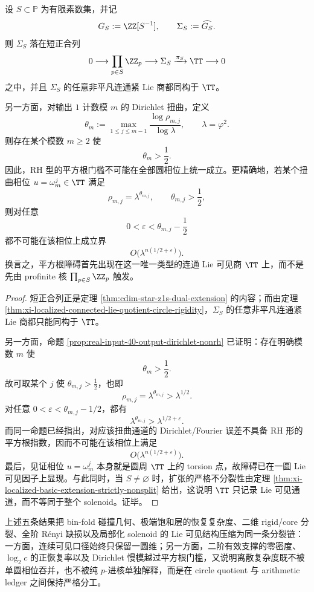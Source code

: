 \begin{theorem}\label{thm:conclusion-circle-lie-factor-square-root-threshold-obstruction}
设 \(S\subset\mathbb P\) 为有限素数集，并记
\[
G_S:=\ZZ[S^{-1}],
\qquad
\Sigma_S:=\widehat{G_S}.
\]
则 \(\Sigma_S\) 落在短正合列
\[
0\longrightarrow \prod_{p\in S}\ZZ_p\longrightarrow \Sigma_S\xrightarrow{\pi_S}\TT\longrightarrow 0
\]
之中，并且 \(\Sigma_S\) 的任意非平凡连通紧 Lie 商都同构于 \(\TT\)。

另一方面，对输出 \(1\) 计数模 \(m\) 的 Dirichlet 扭曲，定义
\[
\theta_m:=\max_{1\le j\le m-1}\frac{\log\rho_{m,j}}{\log\lambda},
\qquad
\lambda=\varphi^2.
\]
则存在某个模数 \(m\ge 2\) 使
\[
\theta_m>\frac12.
\]
因此，RH 型的平方根门槛不可能在全部圆相位上统一成立。更精确地，若某个扭曲相位 \(u=\omega_m^j\in\TT\) 满足
\[
\rho_{m,j}=\lambda^{\theta_{m,j}},
\qquad
\theta_{m,j}>\frac12,
\]
则对任意
\[
0<\varepsilon<\theta_{m,j}-\frac12
\]
都不可能在该相位上成立界
\[
O\!\bigl(\lambda^{n(1/2+\varepsilon)}\bigr).
\]
换言之，平方根障碍首先出现在这一唯一类型的连通 Lie 可见商 \(\TT\) 上，而不是先由 profinite 核 \(\prod_{p\in S}\ZZ_p\) 触发。
\end{theorem}
\begin{proof}
短正合列正是定理 \ref{thm:cdim-star-z1s-dual-extension} 的内容；而由定理 \ref{thm:xi-localized-connected-lie-quotient-circle-rigidity}，\(\Sigma_S\) 的任意非平凡连通紧 Lie 商都只能同构于 \(\TT\)。

另一方面，命题 \ref{prop:real-input-40-output-dirichlet-nonrh} 已证明：存在明确模数 \(m\) 使
\[
\theta_m>\frac12.
\]
故可取某个 \(j\) 使 \(\theta_{m,j}>\frac12\)，也即
\[
\rho_{m,j}=\lambda^{\theta_{m,j}}>\lambda^{1/2}.
\]
对任意 \(0<\varepsilon<\theta_{m,j}-1/2\)，都有
\[
\lambda^{\theta_{m,j}}>\lambda^{1/2+\varepsilon}.
\]
而同一命题已经指出，对应该扭曲通道的 Dirichlet/Fourier 误差不具备 RH 形的平方根指数，因而不可能在该相位上满足
\[
O\!\bigl(\lambda^{n(1/2+\varepsilon)}\bigr).
\]
最后，见证相位 \(u=\omega_m^j\) 本身就是圆周 \(\TT\) 上的 torsion 点，故障碍已在一圆 Lie 可见因子上显现。与此同时，当 \(S\neq\varnothing\) 时，扩张的严格不分裂性由定理 \ref{thm:xi-localized-basic-extension-strictly-nonsplit} 给出，这说明 \(\TT\) 只记录 Lie 可见通道，而不等同于整个 solenoid。证毕。
\end{proof}

\noindent
上述五条结果把 bin-fold 碰撞几何、极端饱和层的恢复复杂度、二维 rigid/core 分裂、全阶 R\'enyi 缺损以及局部化 solenoid 的 Lie 可见结构压缩为同一条分裂链：一方面，连续可见口径始终只保留一圆维；另一方面，二阶有效支撑的零密度、\(\log_2 c\) 的正恢复率以及 Dirichlet 慢模越过平方根门槛，又说明离散复杂度既不被单圆相位吞并，也不被纯 \(p\)-进核单独解释，而是在 circle quotient 与 arithmetic ledger 之间保持严格分工。

\endinput
